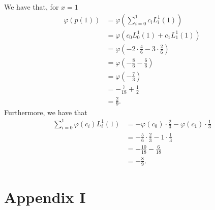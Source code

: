 \documentclass[]{article}
\begin{document}
We have that, for $x=1$ \begin{equation*}
\begin{aligned}
\varphi(p(1)) &= \varphi\left(\sum_{i = 0}^{1}c_iL_i^1(1)\right)\\
&=\varphi\left(c_0L_0^1(1) + c_1L_1^1(1)\right)\\
&=\varphi\left(- 2 \cdot\frac{4}{6} - 3\cdot\frac{2}{6}\right)\\
&=\varphi\left(- \frac{8}{6} - \frac{6}{6}\right)\\
&=\varphi\left(-\frac{7}{3}\right)\\
&=-\frac{7}{18} + \frac{1}{2}\\
&=\frac{2}{9}.
\end{aligned}
\end{equation*}
Furthermore, we have that \begin{equation*}
\begin{aligned}
\sum_{i = 0}^{1}\varphi(c_i)L_i^1(1) &= -\varphi(c_0)\cdot \frac{2}{3} - \varphi(c_1)\cdot\frac{1}{3}\\
&=-\frac{5}{6}\cdot\frac{2}{3} - 1 \cdot \frac{1}{3}\\
&=-\frac{10}{18} - \frac{6}{18}\\
&=-\frac{8}{9}.
\end{aligned}
\end{equation*}

\newpage
\section*{Appendix I}
%
\end{document}
